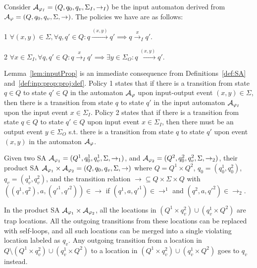 \begin{lemma}
	\label{lem:inputProp}
	Consider ${\cal A}_{\varphi_I}=(Q, q_0, q_v, \Sigma_I, \rightarrow_I)$ be the input automaton derived from ${\cal A}_{\varphi}=(Q, q_0, q_v, \Sigma, \rightarrow)$. The policies we have are as follows:
	\squishlist
	\item[1] $\forall (x,y) \in \Sigma, \forall q, q'\in Q: q\xrightarrow{(x,y)}q' \implies q \xrightarrow{x}_I q'$.
	\item[2] $\forall x \in \Sigma_I, \forall q, q'\in Q: q \xrightarrow{x}_I q' \implies \exists y\in\Sigma_O: q\xrightarrow{(x,y)}q'$.
	\squishend
\end{lemma}
Lemma~\ref{lem:inputProp} is an immediate consequence from Definitions~\ref{def:SA} and~\ref{def:inp:prop:proj:def}.
Policy 1 states that if there is a transition from state $q\in Q$ to state $q' \in Q$  in the automaton ${\cal A}_\varphi$ upon input-output event $(x,y)\in \Sigma$, then there is a transition from state $q$ to state $q'$ in the input automaton ${\cal A}_{\varphi_I}$ upon the input event $x\in\Sigma_I$.
Policy 2 states that if there is a transition from state $q\in Q$ to state $q' \in Q$ upon input event $x\in\Sigma_I$, then there must be an output event $y\in\Sigma_O$ s.t. there is a transition from state $q$ to state $q'$ upon event $(x,y)$ in the automaton ${\cal A}_\varphi$. 
\begin{definition}[Product of SA]
	\label{def:product}
	Given two SA ${\cal A}_{\varphi_1}=(Q^1, q^1_0, q^1_v, \Sigma, \rightarrow_1)$, and ${\cal A}_{\varphi_2}=(Q^2, q^2_0, q^2_v, \Sigma, \rightarrow_2)$, their product SA ${\cal A}_{\varphi_1} \times {\cal A}_{\varphi_2} = (Q, q_0, q_v, \Sigma, \rightarrow)$ where $Q = Q^1 \times Q^2$, $q_0 = (q^1_0, q^2_0)$, $q_v =  (q^1_v, q^2_v)$, and the transition relation $\rightarrow \subseteq Q \times \Sigma \times Q$ with $((q^1, q^2), a, (q'^1, q'^2)) \in \rightarrow$  if  $(q^1, a, q'^1) \in \rightarrow^1$ and  $(q^2, a, q'^2) \in \rightarrow_2$. 
	
	In the product SA ${\cal A}_{\varphi_1} \times {\cal A}_{\varphi_2}$, all the locations in $(Q^1\times q^2_v) \cup (q^1_v \times Q^2)$ are trap locations. 
	All the outgoing transitions from these locations can be replaced with self-loops, and all such locations can be merged into a single violating location labeled as $q_v$. Any outgoing transition from a location in $Q \setminus (Q^1\times q^2_v) \cup (q^1_v \times Q^2)$ to a location in $(Q^1\times q^2_v) \cup (q^1_v \times Q^2)$ goes to $q_v$ instead.  
	
	
\end{definition}

